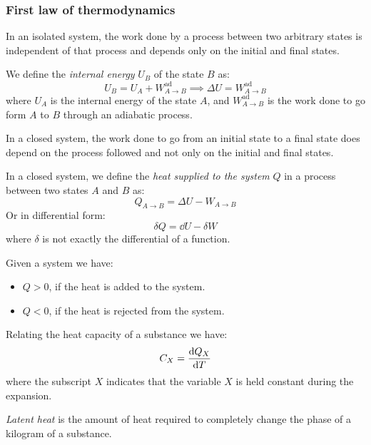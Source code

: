 \documentclass[../../../main.tex]{subfiles}
\begin{document}
\begin{multicols}{2}
  \subsubsection{First law of thermodynamics}
  \begin{law}
    In an isolated system, the work done by a process between two arbitrary states is independent of that process and depends only on the initial and final states.
  \end{law}
  \begin{corollary}
    We define the \emph{internal energy} $U_B$ of the state $B$ as:
    $$U_B=U_A+W_{A\to B}^\text{ad}\implies \Delta U=W_{A\to B}^\text{ad}$$
    where $U_A$ is the internal energy of the state $A$, and $W_{A\to B}^\text{ad}$ is the work done to go form $A$ to $B$ through an adiabatic process.
  \end{corollary}
  \begin{law}
    In a closed system, the work done to go from an initial state to a final state does depend on the process followed and not only on the initial and final states.
  \end{law}
  \begin{corollary}
    In a closed system, we define the \emph{heat supplied to the system} $Q$ in a process between two states $A$ and $B$ as:
    $$Q_{A\to B}=\Delta U-W_{A\to B}$$
    Or in differential form:
    $$\delta Q=\dd{U}-\delta W$$
    where $\delta$ is not exactly the differential of a function.
  \end{corollary}
  \begin{lemma}
    Given a system we have:
    \begin{itemize}
      \item $Q>0$, if the heat is added to the system.
      \item $Q<0$, if the heat is rejected from the system.
    \end{itemize}
  \end{lemma}
  \begin{definition}
    Relating the heat capacity of a substance we have: $$C_X=\dv{Q_X}{T}$$
    where the subscript $X$ indicates that the variable $X$ is held constant during the expansion.
  \end{definition}
  \begin{definition}
    \emph{Latent heat} is the amount of heat required to completely change the phase of a kilogram of a substance.

\end{definition}
\end{multicols}
\end{document}

